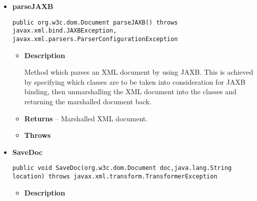 \documentclass[11pt,a4paper]{report}
\begin{document}
{{{{\begin{itemize}
{\begin{itemize}
{Method add an XSD schema definition for the document that is to be parsed.
}
\item{
{\bf  Parameters}
  \begin{itemize}
   \item{
\texttt{path\_to\_schema} -- String location of the XSD file.}
  \end{itemize}
}%
\item{{\bf  Throws}
}%
\end{itemize}
}%
\item{ 
\hypertarget{parsers.ParserUtils.parseJAXB()}{{\bf  parseJAXB}\\}
\begin{lstlisting}[frame=none]
public org.w3c.dom.Document parseJAXB() throws javax.xml.bind.JAXBException, javax.xml.parsers.ParserConfigurationException\end{lstlisting} %
\begin{itemize}
\item{
{\bf  Description}

Method which parses an XML document by using JAXB. This is achieved by specifying which classes are to be taken into consideration for JAXB binding, then unmarshalling the XML document into the classes and returning the marshalled document back.
}
\item{{\bf  Returns} -- 
Marshalled XML document. 
}%
\item{{\bf  Throws}
}%
\end{itemize}
}%
\item{ 
\hypertarget{parsers.ParserUtils.SaveDoc(org.w3c.dom.Document, java.lang.String)}{{\bf  SaveDoc}\\}
\begin{lstlisting}[frame=none]
public void SaveDoc(org.w3c.dom.Document doc,java.lang.String location) throws javax.xml.transform.TransformerException\end{lstlisting} %
\begin{itemize}
\item{
{\bf  Description}

}
\end{itemize}}
\end{itemize}}}}}
\end{document}
